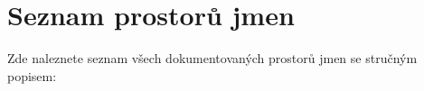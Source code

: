 \section{Seznam prostorů jmen}
Zde naleznete seznam všech dokumentovaných prostorů jmen se stručným popisem\+:\begin{DoxyCompactList}
\item{}
\end{DoxyCompactList}
